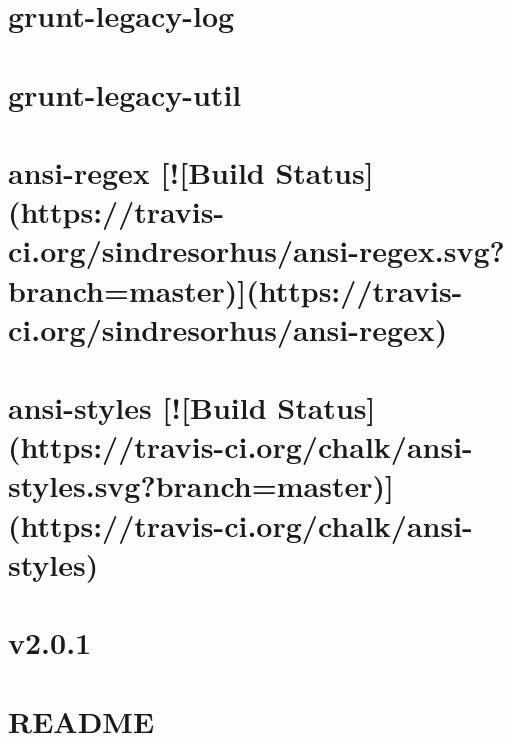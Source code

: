 \documentclass[twoside]{book}
\newcommand{\+}{\discretionary{\mbox{\scriptsize$\hookleftarrow$}}{}{}}
\begin{document}
\chapter{grunt-\/legacy-\/log}
\label{md_app_web_node_modules_grunt-legacy-log-utils__r_e_a_d_m_e}

\chapter{grunt-\/legacy-\/util}
\label{md_app_web_node_modules_grunt-legacy-util__r_e_a_d_m_e}

\chapter{ansi-\/regex \mbox{[}!\mbox{[}Build Status\mbox{]}(https\+://travis-\/ci.org/sindresorhus/ansi-\/regex.svg?branch=master)\mbox{]}(https\+://travis-\/ci.org/sindresorhus/ansi-\/regex)}
\label{md_app_web_node_modules_grunt-string-replace_node_modules_ansi-regex_readme}

\chapter{ansi-\/styles \mbox{[}!\mbox{[}Build Status\mbox{]}(https\+://travis-\/ci.org/chalk/ansi-\/styles.svg?branch=master)\mbox{]}(https\+://travis-\/ci.org/chalk/ansi-\/styles)}
\label{md_app_web_node_modules_grunt-string-replace_node_modules_ansi-styles_readme}

\chapter{v2.0.1}
\label{md_app_web_node_modules_grunt-string-replace_node_modules_async__c_h_a_n_g_e_l_o_g}

\chapter{R\+E\+A\+D\+ME}
\label{md_app_web_node_modules_grunt-string-replace_node_modules_async__r_e_a_d_m_e}

\end{document}
